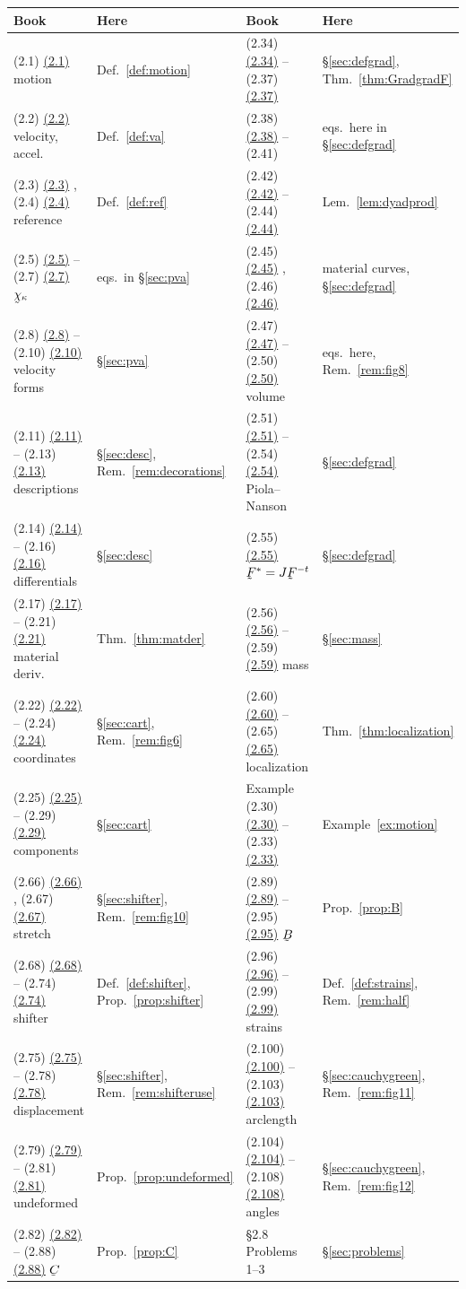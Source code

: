 \documentclass[17pt,a4paper]{extreport}
\makeatletter
\DeclareRobustCommand{\vek}[1]{\underaccent{\tilde}{#1}}
\newcommand{\bB}{\vek{B}}
\newcommand{\bC}{\vek{C}}
\newcommand{\bF}{\vek{F}}
\newcommand{\bchi}{\vek{\chi}}
\theoremstyle{scplain}
\theoremstyle{scdefn}
\newcommand{\eqr@do}[1]{%
  \begingroup
    \@ifundefined{eqal@#1}{\def\eqr@t{#1}}%
                          {\edef\eqr@t{\csname eqal@#1\endcsname}}%
    \@ifundefined{r@eq:\eqr@t}%
      {\textup{(#1)}}%
      {\hyperref[eq:\eqr@t]{\textup{(#1)}}}%
  \endgroup}
\DeclareRobustCommand{\eqr}[1]{%
  \ifmmode\text{\eqr@do{#1}}\else\eqr@do{#1}\fi}
\makeatother
\begin{document}
\renewcommand{\arraystretch}{1.2}
\begin{center}\scriptsize
\begin{tabular}{@{}ll@{\hspace{1.6em}}ll@{}}
\hline
Book & Here & Book & Here\\
\hline
\eqr{2.1} motion & Def.~\ref{def:motion}
 & \eqr{2.34}--\eqr{2.37} & \S\ref{sec:defgrad}, Thm.~\ref{thm:GradgradF}\\
\eqr{2.2} velocity, accel. & Def.~\ref{def:va}
 & \eqr{2.38}--(2.41) & eqs.\ here in \S\ref{sec:defgrad}\\
\eqr{2.3}, \eqr{2.4} reference & Def.~\ref{def:ref}
 & \eqr{2.42}--\eqr{2.44} & Lem.~\ref{lem:dyadprod}\\
\eqr{2.5}--\eqr{2.7} $\bchi_\kappa$ & eqs.\ in \S\ref{sec:pva}
 & \eqr{2.45}, \eqr{2.46} & material curves, \S\ref{sec:defgrad}\\
\eqr{2.8}--\eqr{2.10} velocity forms & \S\ref{sec:pva}
 & \eqr{2.47}--\eqr{2.50} volume & eqs.\ here, Rem.~\ref{rem:fig8}\\
\eqr{2.11}--\eqr{2.13} descriptions & \S\ref{sec:desc}, Rem.~\ref{rem:decorations}
 & \eqr{2.51}--\eqr{2.54} Piola--Nanson & \S\ref{sec:defgrad}\\
\eqr{2.14}--\eqr{2.16} differentials & \S\ref{sec:desc}
 & \eqr{2.55} $\bF^{*}=J\bF^{-t}$ & \S\ref{sec:defgrad}\\
\eqr{2.17}--\eqr{2.21} material deriv. & Thm.~\ref{thm:matder}
 & \eqr{2.56}--\eqr{2.59} mass & \S\ref{sec:mass}\\
\eqr{2.22}--\eqr{2.24} coordinates & \S\ref{sec:cart}, Rem.~\ref{rem:fig6}
 & \eqr{2.60}--\eqr{2.65} localization & Thm.~\ref{thm:localization}\\
\eqr{2.25}--\eqr{2.29} components & \S\ref{sec:cart}
 & Example \eqr{2.30}--\eqr{2.33} & Example~\ref{ex:motion}\\
\eqr{2.66}, \eqr{2.67} stretch & \S\ref{sec:shifter}, Rem.~\ref{rem:fig10}
 & \eqr{2.89}--\eqr{2.95} $\bB$ & Prop.~\ref{prop:B}\\
\eqr{2.68}--\eqr{2.74} shifter & Def.~\ref{def:shifter}, Prop.~\ref{prop:shifter}
 & \eqr{2.96}--\eqr{2.99} strains & Def.~\ref{def:strains}, Rem.~\ref{rem:half}\\
\eqr{2.75}--\eqr{2.78} displacement & \S\ref{sec:shifter}, Rem.~\ref{rem:shifteruse}
 & \eqr{2.100}--\eqr{2.103} arclength & \S\ref{sec:cauchygreen}, Rem.~\ref{rem:fig11}\\
\eqr{2.79}--\eqr{2.81} undeformed & Prop.~\ref{prop:undeformed}
 & \eqr{2.104}--\eqr{2.108} angles & \S\ref{sec:cauchygreen}, Rem.~\ref{rem:fig12}\\
\eqr{2.82}--\eqr{2.88} $\bC$ & Prop.~\ref{prop:C}
 & \S2.8 Problems 1--3 & \S\ref{sec:problems}\\
\hline
\end{tabular}
\end{center}
\end{document}
